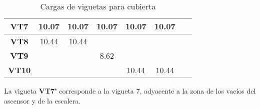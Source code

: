 \begin{table}[H]
\begin{tabular}{|c|c|c|c|c|c|c|}
\hline
{\cellcolor[rgb]{0.741,0.89,0.741}}\textbf{VT7}   & 10.07                                            & 10.07                                            & 10.07                                           & 10.07                                           & 10.07                                             & ~                                                  \\ 
\hline
{\cellcolor[rgb]{0.741,0.89,0.741}}\textbf{VT8}   & 10.44                                            & 10.44                                            & ~                                               & ~                                               & ~                                                 & ~                                                  \\ 
\hline
{\cellcolor[rgb]{0.741,0.89,0.741}}\textbf{VT9}   & ~                                                & ~                                                & 8.62                                            & ~                                               & ~                                                 & ~                                                  \\ 
\hline
{\cellcolor[rgb]{0.741,0.89,0.741}}\textbf{VT10}  & ~                                                & ~                                                & ~                                               & 10.44                                           & 10.44                                             & ~                                                  \\
\hline
\end{tabular}
    \caption{Cargas de viguetas para cubierta}
  \label{tab:loadcub}%
\end{table}%

La vigueta \textbf{VT7'} corresponde a la vigueta 7, adyacente a la zona de los vacíos del ascensor y de la escalera.
